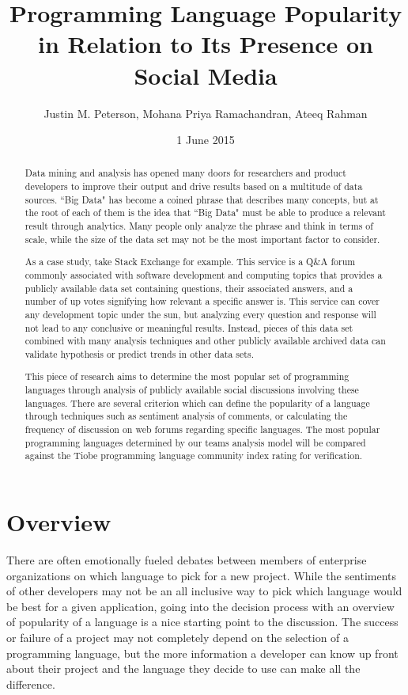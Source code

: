\documentclass{sig-alternate}
\begin{document}
\title{Programming Language Popularity in Relation to Its Presence on Social Media}
\author{
\alignauthor
Justin M. Peterson,
Mohana Priya Ramachandran,
Ateeq Rahman
}
\date{1 June 2015}
\maketitle
\begin{abstract}

Data mining and analysis has opened many doors for researchers and product developers to improve their output and drive results based on a multitude of data sources. ``Big Data" has become a coined phrase that describes many concepts, but at the root of each of them is the idea that ``Big Data" must be able to produce a relevant result through analytics. Many people only analyze the phrase and think in terms of scale, while the size of the data set may not be the most important factor to consider. 

As a case study, take Stack Exchange \cite{iEEE:6542441} for example. This service is a Q\&A forum commonly associated with software development and computing topics that provides a publicly available data set containing questions, their associated answers, and a number of up votes signifying how relevant a specific answer is. This service can cover any development topic under the sun, but analyzing every question and response will not lead to any conclusive or meaningful results. Instead, pieces of this data set combined with many analysis techniques and other publicly available archived data can validate hypothesis or predict trends in other data sets. 

This piece of research aims to determine the most popular set of programming languages through analysis of publicly available social discussions involving these languages. There are several criterion which can define the popularity of a language through techniques such as sentiment analysis of comments, or calculating the frequency of discussion on web forums regarding specific languages. The most popular programming languages determined by our team\textsc{}s analysis model will be compared against the Tiobe programming language community index rating for verification.  

\end{abstract}

\section{Overview}
\label{overview}
There are often emotionally fueled debates between members of enterprise organizations on which language to pick for a new project. While the sentiments of other developers may not be an all inclusive way to pick which language would be best for a given application, going into the decision process with an overview of popularity of a language is a nice starting point to the discussion. The success or failure of a project may not completely depend on the selection of a programming language, but the more information a developer can know up front about their project and the language they decide to use can make all the difference.
\end{document}
